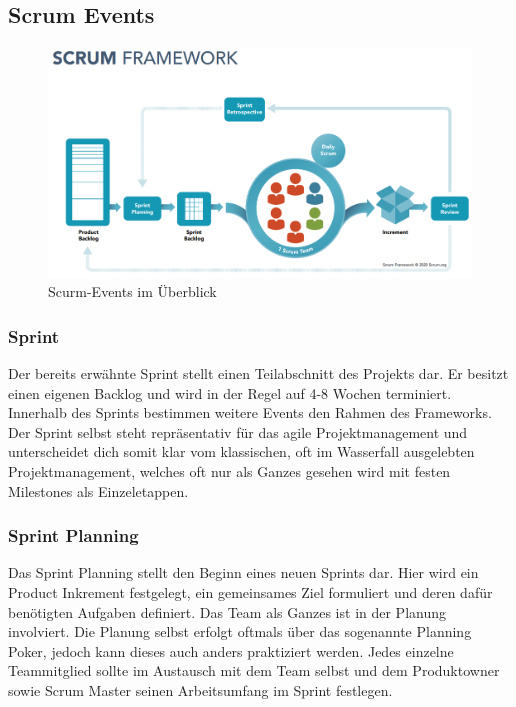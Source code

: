 \subsection{Scrum Events}
\begin{figure}[!htb]
  \centering
  \includegraphics[width=1\textwidth]{figures/daniel/Bild-2.png}
  \caption[]{Scurm-Events im Überblick}
  \label{fig:scrum_events}
\end{figure}

\subsubsection{Sprint}
Der bereits erwähnte Sprint stellt einen Teilabschnitt des Projekts dar. Er besitzt einen eigenen Backlog und wird in der Regel auf 4-8 Wochen terminiert. Innerhalb des Sprints bestimmen weitere Events den Rahmen des Frameworks. Der Sprint selbst steht repräsentativ für das agile Projektmanagement und unterscheidet dich somit klar vom klassischen, oft im Wasserfall ausgelebten Projektmanagement, welches oft nur als Ganzes gesehen wird mit festen Milestones als Einzeletappen.

\subsubsection{Sprint Planning}
Das Sprint Planning stellt den Beginn eines neuen Sprints dar. Hier wird ein Product Inkrement festgelegt, ein gemeinsames Ziel formuliert und deren dafür benötigten Aufgaben definiert. Das Team als Ganzes ist in der Planung involviert. Die Planung selbst erfolgt oftmals über das sogenannte Planning Poker, jedoch kann dieses auch anders praktiziert werden. Jedes einzelne Teammitglied sollte im Austausch mit dem Team selbst und dem Produktowner sowie Scrum Master seinen Arbeitsumfang im Sprint festlegen.



